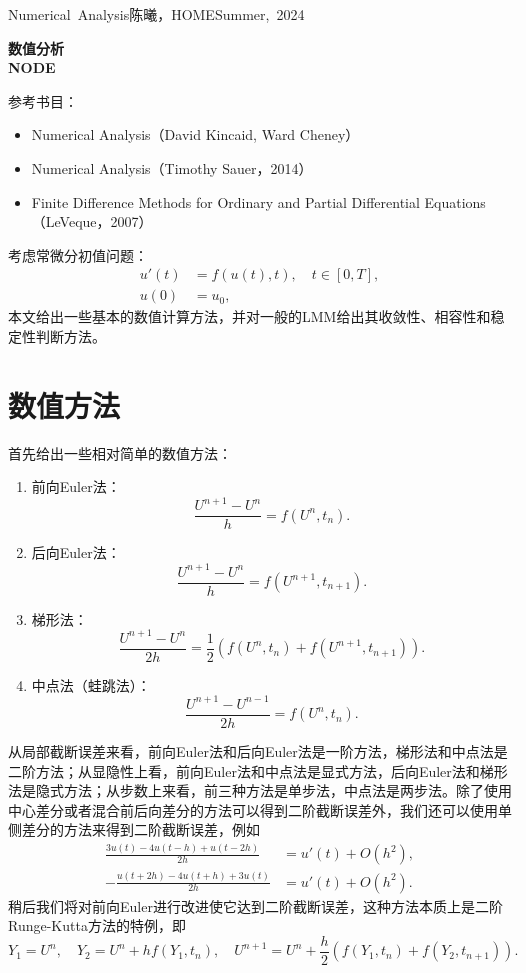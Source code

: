\documentclass[a4paper,10pt]{ctexart}
\begin{document}
\hfill\vbox{\hbox{Numerical Analysis}\hbox{陈曦，HOME}\hbox{Summer, 2024}}

\begin{center}\Large
    \textbf{数值分析}\\{\normalsize\bf {NODE}}
\end{center}
\vskip 30pt
\small {参考书目：
\begin{itemize}
    \item Numerical Analysis（David Kincaid, Ward Cheney）
    \item Numerical Analysis（Timothy Sauer，2014）
    \item Finite Difference Methods for Ordinary and Partial Differential Equations（LeVeque，2007）
\end{itemize}}
\vskip 30pt

考虑常微分初值问题：
\begin{equation}
    \begin{aligned}
        u'(t) &= f(u(t),t),\quad t\in [0,T],\\
        u(0) &= u_0,
    \end{aligned}
\end{equation}
本文给出一些基本的数值计算方法，并对一般的LMM给出其收敛性、相容性和稳定性判断方法。

\section{数值方法}
首先给出一些相对简单的数值方法：
\begin{enumerate}
    \item 前向Euler法：
    \[
        \frac{U^{n+1} - U^n}{h} = f(U^n,t_n).
    \]
    \item 后向Euler法：
    \[
        \frac{U^{n+1} - U^n}{h} = f(U^{n+1},t_{n+1}).
    \]
    \item 梯形法：
    \[
        \frac{U^{n+1}-U^{n}}{2h} = \frac{1}{2}(f(U^n,t_n)+f(U^{n+1},t_{n+1})).
    \]
    \item 中点法（蛙跳法）：
    \[
        \frac{U^{n+1} - U^{n-1}}{2h} = f(U^n,t_n).
    \]
\end{enumerate}
从局部截断误差来看，前向Euler法和后向Euler法是一阶方法，梯形法和中点法是二阶方法；从显隐性上看，前向Euler法和中点法是显式方法，后向Euler法和梯形法是隐式方法；从步数上来看，前三种方法是单步法，中点法是两步法。除了使用中心差分或者混合前后向差分的方法可以得到二阶截断误差外，我们还可以使用单侧差分的方法来得到二阶截断误差，例如
\[
    \begin{aligned}
        \frac{3u(t)-4u(t-h)+u(t-2h)}{2h} &= u'(t) + O(h^2),\\
        -\frac{u(t+2h)-4u(t+h)+3u(t)}{2h} &= u'(t) + O(h^2).
    \end{aligned}
\]
稍后我们将对前向Euler进行改进使它达到二阶截断误差，这种方法本质上是二阶Runge-Kutta方法的特例，即
\[
    Y_1 = U^n,\quad Y_2 = U^n + hf(Y_1,t_n),\quad U^{n+1} = U^n + \frac{h}{2}(f(Y_1,t_n)+f(Y_2,t_{n+1})).
\]
\end{document}
